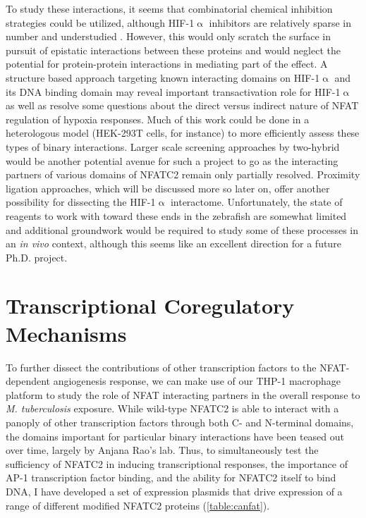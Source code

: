To study these interactions, it seems that combinatorial chemical inhibition strategies could be utilized, although HIF\hyp{}1$\upalpha$ inhibitors are relatively sparse in number and understudied \citep{Viziteu2016}. However, this would only scratch the surface in pursuit of epistatic interactions between these proteins and would neglect the potential for protein\hyp{}protein interactions in mediating part of the effect. A structure based approach targeting known interacting domains on HIF\hyp{}1$\upalpha$ and its DNA binding domain may reveal important transactivation role for HIF\hyp{}1$\upalpha$ as well as resolve some questions about the direct versus indirect nature of NFAT regulation of hypoxia responses. Much of this work could be done in a heterologous model (HEK\hyp{}293T cells, for instance) to more efficiently assess these types of binary interactions. Larger scale screening approaches by two\hyp{}hybrid would be another potential avenue for such a project to go as the interacting partners of various domains of NFATC2 remain only partially resolved. Proximity ligation approaches, which will be discussed more so later on, offer another possibility for dissecting the HIF\hyp{}1$\upalpha$ interactome. Unfortunately, the state of reagents to work with toward these ends in the zebrafish are somewhat limited and additional groundwork would be required to study some of these processes in an \textit{in vivo} context, although this seems like an excellent direction for a future Ph.D. project.

\section{Transcriptional Coregulatory Mechanisms}\label{nfatpartners}

To further dissect the contributions of other transcription factors to the NFAT\hyp{}dependent angiogenesis response, we can make use of our THP\hyp{}1 macrophage platform to study the role of NFAT interacting partners in the overall response to \textit{M. tuberculosis} exposure. While wild\hyp{}type NFATC2 is able to interact with a panoply of other transcription factors through both C\hyp{} and N\hyp{}terminal domains, the domains important for particular binary interactions have been teased out over time, largely by Anjana Rao's lab. Thus, to simultaneously test the sufficiency of NFATC2 in inducing transcriptional responses, the importance of AP\hyp{}1 transcription factor binding, and the ability for NFATC2 itself to bind DNA, I have developed a set of expression plasmids that drive expression of a range of different modified NFATC2 proteins (\autoref{table:canfat}).


